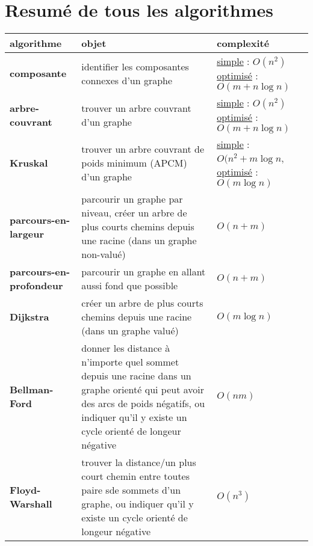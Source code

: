 \documentclass[french]{article}
\theoremstyle{definition}
\begin{document}
		\section{Resumé de tous les algorithmes}
		\begin{tabularx}{\textwidth}{| X || X | X |}
			\hline
			\textbf{algorithme} & \textbf{objet} & \textbf{complexité}\\
			\hline
			\hline
			\textbf{composante} & identifier les composantes connexes d'un graphe & \underline{simple} : $O(n^2)$ \underline{optimisé} : $O(m + n \log n)$\\
			\hline
			\textbf{arbre-couvrant} & trouver un arbre couvrant d'un graphe & \underline{simple} : $O(n^2)$ \underline{optimisé} : $O(m + n \log n)$ \\
			\hline
			\textbf{Kruskal} & trouver un arbre couvrant de poids minimum (APCM) d'un graphe & \underline{simple} : $O(n^2 + m \log n$, \underline{optimisé} : $O(m \log n)$ \\
			\hline
			\textbf{parcours-en-largeur} & parcourir un graphe par niveau, créer un arbre de plus courts chemins depuis une racine (dans un graphe non-valué) & $O(n + m)$ \\
			\hline
			\textbf{parcours-en-profondeur} & parcourir un graphe en allant aussi fond que possible & $O(n + m)$  \\
			\hline
			\textbf{Dijkstra} & créer un arbre de plus courts chemins depuis une racine (dans un graphe valué) & $O(m \log n)$ \\
			\hline
			\textbf{Bellman-Ford} & donner les distance à n'importe quel sommet depuis une racine dans un graphe orienté qui peut avoir des arcs de poids négatifs, ou indiquer qu'il y existe un cycle orienté de longeur négative & $O(nm)$ \\
			\hline
			\textbf{Floyd-Warshall} & trouver la distance/un plus court chemin entre toutes paire sde sommets d'un graphe, ou indiquer qu'il y existe un cycle orienté de longeur négative & $O(n^3)$ \\
			\hline
		\end{tabularx}
				
\end{document}
